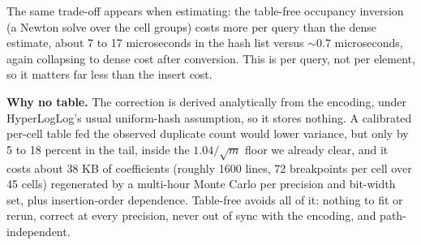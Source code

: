 \medskip
\noindent The same trade-off appears when estimating: the table-free occupancy inversion (a Newton solve over the cell groups) costs more per query than the dense estimate, about 7 to 17 microseconds in the hash list versus $\sim 0.7$ microseconds, again collapsing to dense cost after conversion. This is per query, not per element, so it matters far less than the insert cost.
\begin{center}
\end{center}

\medskip
{\small
\noindent\textbf{Why no table.} The correction is derived analytically from the encoding, under HyperLogLog's usual uniform-hash assumption, so it stores nothing. A calibrated per-cell table fed the observed duplicate count would lower variance, but only by 5 to 18 percent in the tail, inside the $1.04/\sqrt{m}$ floor we already clear, and it costs about 38 KB of coefficients (roughly 1600 lines, 72 breakpoints per cell over 45 cells) regenerated by a multi-hour Monte Carlo per precision and bit-width set, plus insertion-order dependence. Table-free avoids all of it: nothing to fit or rerun, correct at every precision, never out of sync with the encoding, and path-independent.
}

